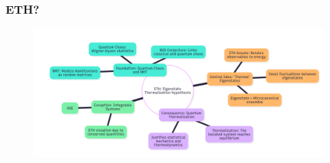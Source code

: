 \begin{frame}
\frametitle{ETH?}
\begin{figure}
    \centering\includegraphics[width=\textwidth]{images/mindmap-ETH.png}
    \label{fig:ETH}
\end{figure}
\end{frame}

